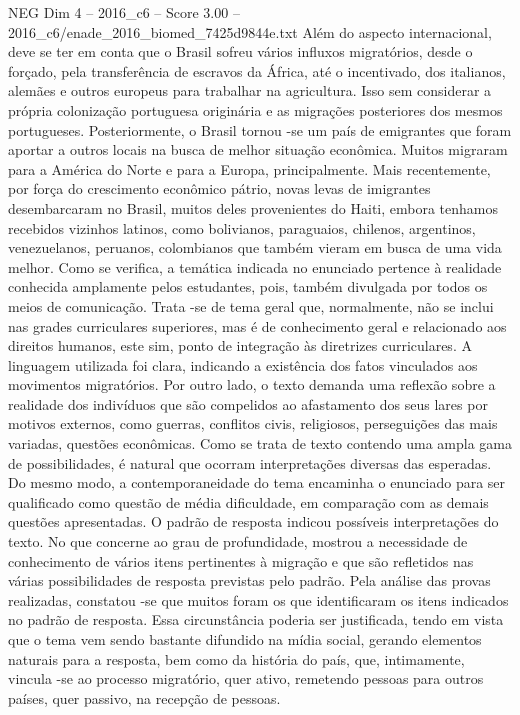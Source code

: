 \begin{textsample}{NEG Dim 4 – 2016\_c6 – Score 3.00 – 2016\_c6/enade\_2016\_biomed\_7425d9844e.txt}
Além do aspecto internacional, deve se ter em conta que o Brasil sofreu vários influxos migratórios, desde o forçado, pela transferência de escravos da África, até o incentivado, dos italianos, alemães e outros europeus para trabalhar na agricultura.
Isso sem considerar a própria colonização portuguesa originária e as migrações posteriores dos mesmos portugueses.
Posteriormente, o Brasil tornou -se um país de emigrantes que foram aportar a outros locais na busca de melhor situação econômica.
Muitos migraram para a América do Norte e para a Europa, principalmente.
Mais recentemente, por força do crescimento econômico pátrio, novas levas de imigrantes desembarcaram no Brasil, muitos deles provenientes do Haiti, embora tenhamos recebidos vizinhos latinos, como bolivianos, paraguaios, chilenos, argentinos, venezuelanos, peruanos, colombianos que também vieram em busca de uma vida melhor.
Como se verifica, a temática indicada no enunciado pertence à realidade conhecida amplamente pelos estudantes, pois, também divulgada por todos os meios de comunicação.
Trata -se de tema geral que, normalmente, não se inclui nas grades curriculares superiores, mas é de conhecimento geral e relacionado aos direitos humanos, este sim, ponto de integração às diretrizes curriculares.
A linguagem utilizada foi clara, indicando a existência dos fatos vinculados aos movimentos migratórios.
Por outro lado, o texto demanda uma reflexão sobre a realidade dos indivíduos que são compelidos ao afastamento dos seus lares por motivos externos, como guerras, conflitos civis, religiosos, perseguições das mais variadas, questões econômicas.
Como se trata de texto contendo uma ampla gama de possibilidades, é natural que ocorram interpretações diversas das esperadas.
Do mesmo modo, a contemporaneidade do tema encaminha o enunciado para ser qualificado como questão de média dificuldade, em comparação com as demais questões apresentadas.
O padrão de resposta indicou possíveis interpretações do texto.
No que concerne ao grau de profundidade, mostrou a necessidade de conhecimento de vários itens pertinentes à migração e que são refletidos nas várias possibilidades de resposta previstas pelo padrão.
Pela análise das provas realizadas, constatou -se que muitos foram os que identificaram os itens indicados no padrão de resposta.
Essa circunstância poderia ser justificada, tendo em vista que o tema vem sendo bastante difundido na mídia social, gerando elementos naturais para a resposta, bem como da história do país, que, intimamente, vincula -se ao processo migratório, quer ativo, remetendo pessoas para outros países, quer passivo, na recepção de pessoas.

\end{textsample}
